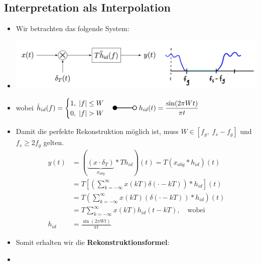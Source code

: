 \documentclass[11pt]{article}
\newcommand{\invtransform}[2]{%
    \begin{tikzpicture}
        \filldraw[thick] (0,0) circle (0.1);
        \draw[thick] (0.1,0) -- (#2 -0.1,0) node[midway, above] {#1};
        \draw[thick] (#2,0) circle (0.1);
    \end{tikzpicture}%
}
\begin{document}
\pagebreak

\subsection*{Interpretation als Interpolation}
\vspace*{-0.5cm}
\begin{itemize}[leftmargin=0pt]
    \item[] Wir betrachten das folgende System:
    \item[] \begin{center}
        \includegraphics[width=0.7\linewidth]{docimgs/filtering2.jpg}
    \end{center}
    \item[] wobei $\hat{h}_{id}(f) = \displaystyle\begin{cases}
        1, \; |f| \leq W \\
        0, \; |f| > W
    \end{cases} \invtransform{}{1} \; h_{id}(t)=\displaystyle\frac{\sin(2 \pi W t)}{\pi t}$
    \item[] Damit die perfekte Rekonstruktion möglich ist, muss $W \in [f_g, \; f_s -f_g]$ und $f_s \geq 2f_g$ gelten.
    \begin{align*}
        y(t) &= \left(\underbrace{(x \cdot \delta_T)}_{x_{abg}} \ast T h_{id}\right)(t) = T (x_{abg} \ast h_{id})(t) \\
        &= T \left[ \left( \sum_{k = -\infty}^{\infty} x(kT) \delta(\cdot -kT) \right)  \ast h_{id} \right](t) \\
        &= T \left( \sum_{k = -\infty}^{\infty} x(kT) \left(\delta(\cdot -kT) \right)  \ast h_{id}\right) (t) \\
        &= T \sum_{k = -\infty}^{\infty} x(kT) h_{id}(t-kT), \hspace{12pt} \text{wobei}\\
        h_{id} &= \displaystyle\frac{\sin(2 \pi W t)}{\pi t}
    \end{align*}
    \item[] Somit erhalten wir die \textbf{Rekonstruktionsformel}:
    \item[] %
\end{itemize}
\end{document}
